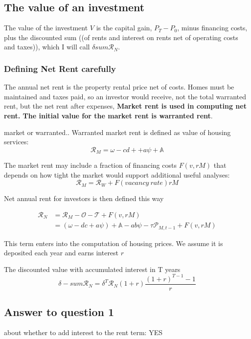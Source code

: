  \subsection{The value of an investment}
The value of the investment $V$ is  the capital gain, $P_{T}-P_{0}$, minus financing costs, plus the discounted sum ((of rents and interest on rents net of operating costs and taxes)), which I will call $\delta sum\mathcal{R}_N$.  

\subsubsection{Defining Net Rent carefully}

The annual \gls{net rent} is the property rental price  net of costs. Homes must be maintained and taxes paid, so an investor would receive, not the total warranted rent, but the net rent after expenses,
\textbf{Market rent is used in computing net rent. The initial value for the market rent is \gls{warranted rent}}.

market or warranted..
Warranted market rent is defined as value of housing services:
\[\mathcal{R}_M = \omega - cd+ + a\psi + \mathbb{A}\]

The market rent may include  a fraction of financing costs $F(v, rM)$  that depends on how tight the market would support additional useful analyses:
 \[\mathcal{R}_M=\mathcal{R}_W + F(vacancy\ rate) rM\]

Net annual rent for investors is then  defined this way 

\begin{align}\mathcal{R}_N &= \mathcal{R}_M - \mathcal{O} - \mathcal{T} + F(v, rM)\nonumber\\
&= (\omega - {dc} + a\psi )+ \mathbb{A} - a b \psi - \tau  \mathcal{P}_{M, t-1}  + F(v, rM)
\end{align}

This term enters into the computation of housing prices. We assume it is deposited each year and earns interest $r$

The discounted value with accumulated interest in T years 
\[\delta-sum\mathcal{R}_N=\delta^T\mathcal{R}_N (1+r)\frac{(1+r)^{T-1}-1}{r} \]


\subsection{Answer to question 1} about whether to add interest to the rent term: YES

